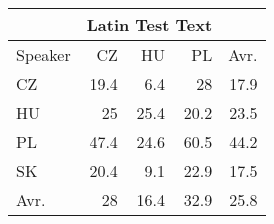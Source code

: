 \begin{tabular}{l|rrr|r}
\hline
 & \multicolumn{3}{c}{Latin Test Text} & \\
\hline
 Speaker   &   CZ &   HU &   PL &   Avr. \\
\hline
 CZ        & 19.4 &  6.4 & 28   &   17.9 \\
 HU        & 25   & 25.4 & 20.2 &   23.5 \\
 PL        & 47.4 & 24.6 & 60.5 &   44.2 \\
 SK        & 20.4 &  9.1 & 22.9 &   17.5 \\
\hline
 Avr.     & 28   & 16.4 & 32.9 &   25.8 \\
\hline
\end{tabular}